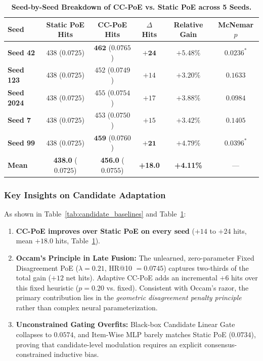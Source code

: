 \begin{table}[t]
\centering
\small
\caption{\textbf{Seed-by-Seed Breakdown of CC-PoE vs. Static PoE across 5 Seeds.}}
\label{tab:seed_breakdown}
\begin{tabular}{lccccc}
\toprule
\textbf{Seed} & \textbf{Static PoE Hits} & \textbf{CC-PoE Hits} & \textbf{$\Delta$ Hits} & \textbf{Relative Gain} & \textbf{McNemar $p$} \\
\midrule
\textbf{Seed 42} & $438$ ($0.0725$) & $\mathbf{462}$ ($0.0765$) & $\mathbf{+24}$ & $+5.48\%$ & $0.0236^*$ \\
\textbf{Seed 123} & $438$ ($0.0725$) & $452$ ($0.0749$) & $+14$ & $+3.20\%$ & $0.1633$ \\
\textbf{Seed 2024} & $438$ ($0.0725$) & $455$ ($0.0754$) & $+17$ & $+3.88\%$ & $0.0984$ \\
\textbf{Seed 7} & $438$ ($0.0725$) & $453$ ($0.0750$) & $+15$ & $+3.42\%$ & $0.1405$ \\
\textbf{Seed 99} & $438$ ($0.0725$) & $\mathbf{459}$ ($0.0760$) & $\mathbf{+21}$ & $+4.79\%$ & $0.0396^*$ \\
\midrule
\textbf{Mean} & \textbf{438.0} ($0.0725$) & \textbf{456.0} ($0.0755$) & \textbf{+18.0} & \textbf{+4.11\%} & --- \\
\bottomrule
\end{tabular}
\end{table}

\subsubsection{Key Insights on Candidate Adaptation}
As shown in Table~\ref{tab:candidate_baselines} and Table~\ref{tab:seed_breakdown}:
\begin{enumerate}[leftmargin=*]
    \item \textbf{CC-PoE improves over Static PoE on every seed} ($+14$ to $+24$ hits, mean $+18.0$ hits, Table~\ref{tab:seed_breakdown}).
    \item \textbf{Occam's Principle in Late Fusion:} The unlearned, zero-parameter Fixed Disagreement PoE ($\lambda = 0.21$, HR@10 $= 0.0745$) captures two-thirds of the total gain ($+12$ net hits). Adaptive CC-PoE adds an incremental $+6$ hits over this fixed heuristic ($p = 0.20$ vs. fixed). Consistent with Occam's razor, the primary contribution lies in the \emph{geometric disagreement penalty principle} rather than complex neural parameterization.
    \item \textbf{Unconstrained Gating Overfits:} Black-box Candidate Linear Gate collapses to $0.0574$, and Item-Wise MLP barely matches Static PoE ($0.0734$), proving that candidate-level modulation requires an explicit consensus-constrained inductive bias.
\end{enumerate}
